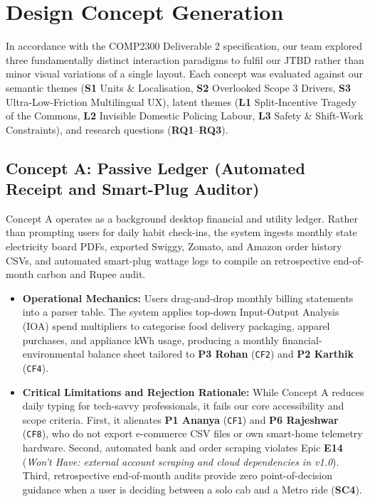 \documentclass[12pt, a4paper]{article}
\begin{document}
\section{Design Concept Generation}
In accordance with the COMP2300 Deliverable 2 specification, our team explored three fundamentally distinct interaction paradigms to fulfil our JTBD rather than minor visual variations of a single layout. Each concept was evaluated against our semantic themes (\textbf{S1} Units \& Localisation, \textbf{S2} Overlooked Scope 3 Drivers, \textbf{S3} Ultra-Low-Friction Multilingual UX), latent themes (\textbf{L1} Split-Incentive Tragedy of the Commons, \textbf{L2} Invisible Domestic Policing Labour, \textbf{L3} Safety \& Shift-Work Constraints), and research questions (\textbf{RQ1}--\textbf{RQ3}).

\subsection{Concept A: Passive Ledger (Automated Receipt and Smart-Plug Auditor)}
Concept A operates as a background desktop financial and utility ledger. Rather than prompting users for daily habit check-ins, the system ingests monthly state electricity board PDFs, exported Swiggy, Zomato, and Amazon order history CSVs, and automated smart-plug wattage logs to compile an retrospective end-of-month carbon and Rupee audit.
\begin{itemize}
    \item \textbf{Operational Mechanics:} Users drag-and-drop monthly billing statements into a parser table. The system applies top-down Input-Output Analysis (IOA) spend multipliers to categorise food delivery packaging, apparel purchases, and appliance kWh usage, producing a monthly financial-environmental balance sheet tailored to \textbf{P3 Rohan} (\texttt{CF2}) and \textbf{P2 Karthik} (\texttt{CF4}).
    \item \textbf{Critical Limitations and Rejection Rationale:} While Concept A reduces daily typing for tech-savvy professionals, it fails our core accessibility and scope criteria. First, it alienates \textbf{P1 Ananya} (\texttt{CF1}) and \textbf{P6 Rajeshwar} (\texttt{CF8}), who do not export e-commerce CSV files or own smart-home telemetry hardware. Second, automated bank and order scraping violates Epic \textbf{E14} (\textit{Won't Have: external account scraping and cloud dependencies in v1.0}). Third, retrospective end-of-month audits provide zero point-of-decision guidance when a user is deciding between a solo cab and a Metro ride (\textbf{SC4}).
\end{itemize}
\end{document}
